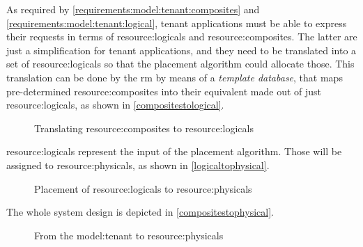 As required by \ref{requirements:model:tenant:composites} and \ref{requirements:model:tenant:logical}, tenant applications must be able to express their requests in terms of \glspl{resource:logical} and \glspl{resource:composite}.
The latter are just a simplification for tenant applications, and they need to be translated into a set of \glspl{resource:logical} so that the placement algorithm could allocate those.
This translation can be done by the \gls{rm} by means of a \textit{template database}, that maps pre-determined \glspl{resource:composite} into their equivalent made out of just \glspl{resource:logical}, as shown in \autoref{compositestological}.

\begin{figure}[!htb]
    \centering
    \usebox{\compositestological}
    \caption{Translating \glspl{resource:composite} to \glspl{resource:logical}}
    \label{compositestological}
\end{figure}

\Glspl{resource:logical} represent the input of the placement algorithm. Those will be assigned to \glspl{resource:physical}, as shown in \autoref{logicaltophysical}.

\begin{figure}[!htb]
    \centering
    \usebox{\logicaltophysical}
    \caption{Placement of \glspl{resource:logical} to \glspl{resource:physical}}
    \label{logicaltophysical}
\end{figure}

The whole system design is depicted in \autoref{compositestophysical}.

\begin{figure}[!htb]
    \centering
    \usebox{\compositestophysical}
    \caption{From the \gls{model:tenant} to \glspl{resource:physical}}
    \label{compositestophysical}
\end{figure}